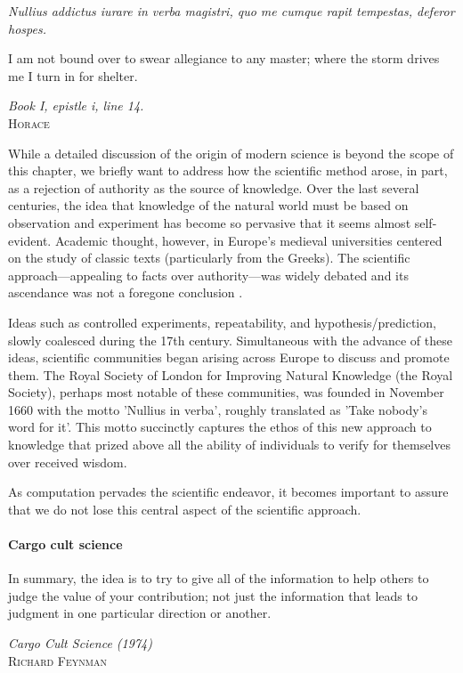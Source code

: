 \documentclass[ChapterTOCs,krantz2]{krantz} %
\begin{document}
\setlength{\epigraphrule}{0pt}
\setlength{\epigraphwidth}{.90\textwidth}
\epigraph%
{%
  \emph{Nullius addictus iurare in verba magistri,
  quo me cumque rapit tempestas, deferor hospes.}

  I am not bound over to swear allegiance to any master; where the storm
  drives me I turn in for shelter.
}%
{\textit{Book I, epistle i, line 14.}\\ \textsc{Horace} }

While a detailed discussion of the origin of modern science is beyond the scope
of this chapter, we briefly want to address how the scientific method arose, in
part, as a rejection of authority as the source of knowledge. Over the last
several centuries, the idea that knowledge of the natural world must be based
on observation and experiment has become so pervasive that it seems almost
self-evident. Academic thought, however, in Europe's medieval universities
centered on the study of classic texts (particularly from the Greeks). The
scientific approach---appealing to facts over authority---was widely debated
and its ascendance was not a foregone conclusion \cite{shapin2011leviathan}.

Ideas such as controlled experiments, repeatability, and hypothesis/prediction,
slowly coalesced during the 17th century.  Simultaneous with the advance of these
ideas, scientific communities began arising across Europe to discuss and promote
them. The Royal Society of London for Improving Natural Knowledge (the Royal Society),
perhaps most notable of these communities, was founded in November 1660 with the motto
'Nullius in verba', roughly translated as 'Take nobody's word for it'. This motto
succinctly captures the ethos of this new approach to knowledge that prized above
all the ability of individuals to verify for themselves over received wisdom.

As computation pervades the scientific endeavor, it becomes important to assure
that we do not lose this central aspect of the scientific approach.

\paragraph{ {\bf Cargo cult science}}

\setlength{\epigraphrule}{0pt}
\setlength{\epigraphwidth}{.90\textwidth}
\epigraph%
{%
  In summary, the idea is to try to give all of the information to
  help others to judge the value of your contribution; not just the
  information that leads to judgment in one particular direction or
  another.
}%
{\textit{Cargo Cult Science (1974)}\\ \textsc{Richard Feynman} }
\end{document}
